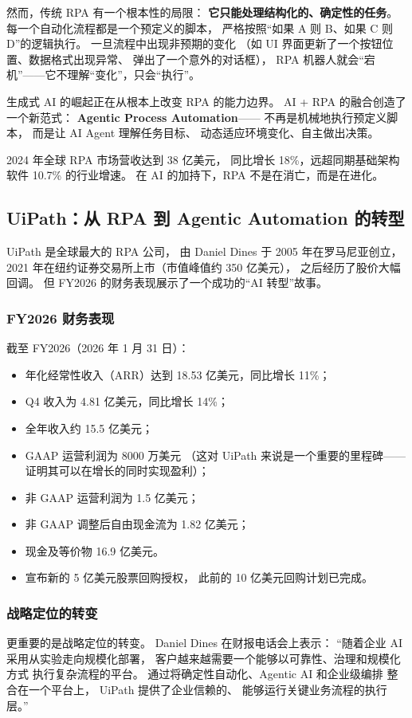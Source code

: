 然而，传统 RPA 有一个根本性的局限：
\textbf{它只能处理结构化的、确定性的任务}。
每一个自动化流程都是一个预定义的脚本，
严格按照``如果 A 则 B、如果 C 则 D''的逻辑执行。
一旦流程中出现非预期的变化
（如 UI 界面更新了一个按钮位置、数据格式出现异常、
弹出了一个意外的对话框），
RPA 机器人就会``宕机''——它不理解``变化''，只会``执行''。

生成式 AI 的崛起正在从根本上改变 RPA 的能力边界。
AI + RPA 的融合创造了一个新范式：
\textbf{Agentic Process Automation}——
不再是机械地执行预定义脚本，
而是让 AI Agent 理解任务目标、
动态适应环境变化、自主做出决策。

2024 年全球 RPA 市场营收达到 38 亿美元，
同比增长 18\%，远超同期基础架构软件 10.7\% 的行业增速。
在 AI 的加持下，RPA 不是在消亡，而是在进化。

\subsection{UiPath：从 RPA 到 Agentic Automation 的转型}

UiPath 是全球最大的 RPA 公司，
由 Daniel Dines 于 2005 年在罗马尼亚创立，
2021 年在纽约证券交易所上市（市值峰值约 350 亿美元），
之后经历了股价大幅回调。
但 FY2026 的财务表现展示了一个成功的``AI 转型''故事。

\subsubsection{FY2026 财务表现}
截至 FY2026（2026 年 1 月 31 日）：

\begin{itemize}[noitemsep]
  \item 年化经常性收入（ARR）达到 18.53 亿美元，同比增长 11\%；
  \item Q4 收入为 4.81 亿美元，同比增长 14\%；
  \item 全年收入约 15.5 亿美元；
  \item GAAP 运营利润为 8000 万美元
        （这对 UiPath 来说是一个重要的里程碑——
        证明其可以在增长的同时实现盈利）；
  \item 非 GAAP 运营利润为 1.5 亿美元；
  \item 非 GAAP 调整后自由现金流为 1.82 亿美元；
  \item 现金及等价物 16.9 亿美元。
  \item 宣布新的 5 亿美元股票回购授权，
        此前的 10 亿美元回购计划已完成。
\end{itemize}

\subsubsection{战略定位的转变}
更重要的是战略定位的转变。
Daniel Dines 在财报电话会上表示：
``随着企业 AI 采用从实验走向规模化部署，
客户越来越需要一个能够以可靠性、治理和规模化方式
执行复杂流程的平台。
通过将确定性自动化、Agentic AI 和企业级编排
整合在一个平台上，
UiPath 提供了企业信赖的、
能够运行关键业务流程的执行层。''

